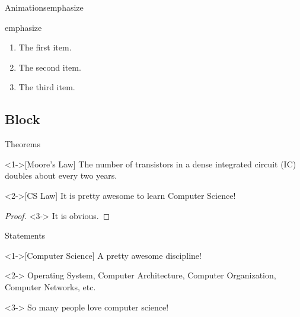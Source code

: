 \documentclass[xcolor=table]{beamer}
\begin{document}
    \begin{frame}{Animations}{emphasize}

        \alert{emphasize}

        \begin{enumerate}
            \item<+-> The first item.
            \item<+-| alert@+> The second item.
            \item<+-> The third item.
        \end{enumerate}
    \end{frame}

    \subsection{Block}
    \begin{frame}{Theorems}
        \begin{theorem}<1->[Moore's Law]
            The number of transistors in a dense integrated circuit (IC) doubles about every two years.
        \end{theorem}
        
        \begin{corollary}<2->[CS Law]
            It is pretty awesome to learn Computer Science!
        \end{corollary}

        \begin{proof}<3->
            It is obvious. \qedhere %
        \end{proof}
    \end{frame}

    \begin{frame}{Statements}
        \begin{definition}<1->[Computer Science]
            A pretty awesome discipline!
        \end{definition}

        \begin{example}<2->
            Operating System, Computer Architecture, Computer Organization, Computer Networks, etc.
        \end{example}

        \begin{fact}<3->
            So many people love computer science!
        \end{fact}
    \end{frame}
\end{document}
